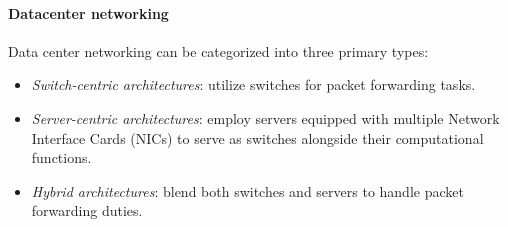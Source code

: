 \paragraph*{Datacenter networking}
Data center networking can be categorized into three primary types:
\begin{itemize}
    \item \textit{Switch-centric architectures}: utilize switches for packet forwarding tasks.
    \item \textit{Server-centric architectures}: employ servers equipped with multiple Network Interface Cards (NICs) to serve as switches alongside their computational functions.
    \item \textit{Hybrid architectures}: blend both switches and servers to handle packet forwarding duties.
\end{itemize}

